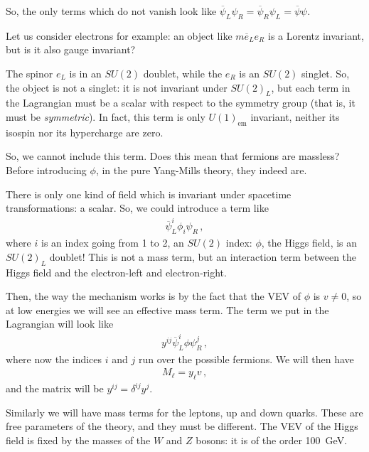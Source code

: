 \documentclass[main.tex]{subfiles}
\begin{document}
So, the only terms which do not vanish look like \(\overline{\psi}_{L} \psi_{R} = \overline{\psi}_{R} \psi_{L} = \overline{\psi} \psi \).


Let us consider electrons for example: an object like \(m \overline{e}_{L} e_R\) is a Lorentz invariant, but is it also gauge invariant?

The spinor \(e_L\) is in an \(SU(2)\) doublet, while the \(e_R\) is an \(SU(2)\) singlet.
So, the object is not a singlet: it is not invariant under \(SU(2)_{L}\), but each term in the Lagrangian must be a scalar with respect to the symmetry group (that is, it must be \emph{symmetric}). 
In fact, this term is only \(U(1) _{\text{em}}\) invariant, neither its isospin nor its hypercharge are zero.

So, we cannot include this term.
Does this mean that fermions are massless?
Before introducing \(\phi \), in the pure Yang-Mills theory, they indeed are.

There is only one kind of field which is invariant under spacetime transformations: a scalar. So, we could introduce a term like 
%
\begin{align}
\overline{\psi}_{L}^{i} \phi_{i} \psi_{R}
\,,
\end{align}
%
where \(i\) is an index going from 1 to 2, an \(SU(2)\) index: \(\phi \), the Higgs field, is an \(SU(2)_L\) doublet!
This is not a mass term, but an interaction term between the Higgs field and the electron-left and electron-right.

Then, the way the mechanism works is by the fact that the VEV of \(\phi \) is \(v \neq 0\), so at low energies we will see an effective mass term.
The term we put in the Lagrangian will look like 
%
\begin{align}
y^{ij} \overline{\psi}^{i}_{L} \phi \psi_{R}^{j}
\,,
\end{align}
%
where now the indices \(i\) and \(j\) run over the possible fermions.
We will then have 
%
\begin{align}
M_\ell = y_{\ell} v 
\,,
\end{align}
%
and the matrix will be \(y^{ij} = \delta^{ij} y^{j}\).

Similarly we will have mass terms for the leptons, up and down quarks.
These are free parameters of the theory, and they must be different. 
The VEV of the Higgs field is fixed by the masses of the \(W\) and \(Z\) bosons: it is of the order \SI{100}{GeV}.
\end{document}
